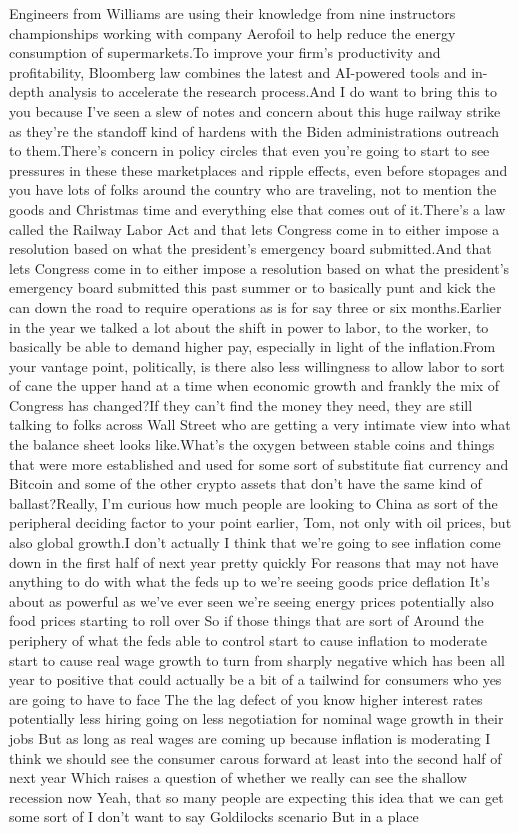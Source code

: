 \documentclass{article}%
\begin{document}
Engineers from Williams are using their knowledge from nine instructors championships working with company Aerofoil to help reduce the energy consumption of supermarkets.To improve your firm's productivity and profitability, Bloomberg law combines the latest and AI{-}powered tools and in{-}depth analysis to accelerate the research process.And I do want to bring this to you because I've seen a slew of notes and concern about this huge railway strike as they're the standoff kind of hardens with the Biden administrations outreach to them.There's concern in policy circles that even you're going to start to see pressures in these these marketplaces and ripple effects, even before stopages and you have lots of folks around the country who are traveling, not to mention the goods and Christmas time and everything else that comes out of it.There's a law called the Railway Labor Act and that lets Congress come in to either impose a resolution based on what the president's emergency board submitted.And that lets Congress come in to either impose a resolution based on what the president's emergency board submitted this past summer or to basically punt and kick the can down the road to require operations as is for say three or six months.Earlier in the year we talked a lot about the shift in power to labor, to the worker, to basically be able to demand higher pay, especially in light of the inflation.From your vantage point, politically, is there also less willingness to allow labor to sort of cane the upper hand at a time when economic growth and frankly the mix of Congress has changed?If they can't find the money they need, they are still talking to folks across Wall Street who are getting a very intimate view into what the balance sheet looks like.What's the oxygen between stable coins and things that were more established and used for some sort of substitute fiat currency and Bitcoin and some of the other crypto assets that don't have the same kind of ballast?Really, I'm curious how much people are looking to China as sort of the peripheral deciding factor to your point earlier, Tom, not only with oil prices, but also global growth.I don't actually I think that we're going to see inflation come down in the first half of next year pretty quickly For reasons that may not have anything to do with what the feds up to we're seeing goods price deflation It's about as powerful as we've ever seen we're seeing energy prices potentially also food prices starting to roll over So if those things that are sort of Around the periphery of what the feds able to control start to cause inflation to moderate start to cause real wage growth to turn from sharply negative which has been all year to positive that could actually be a bit of a tailwind for consumers who yes are going to have to face The the lag defect of you know higher interest rates potentially less hiring going on less negotiation for nominal wage growth in their jobs But as long as real wages are coming up because inflation is moderating I think we should see the consumer carous forward at least into the second half of next year Which raises a question of whether we really can see the shallow recession now Yeah, that so many people are expecting this idea that we can get some sort of I don't want to say Goldilocks scenario But in a place 
\end{document}
